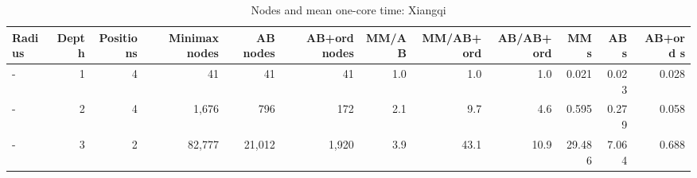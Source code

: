 \begin{table}[!t]
\centering
\caption{Nodes and mean one-core time: Xiangqi}
\label{tab:nodes_xiangqi}
\small
\begin{tabular}{lrrrrrrrrrrr}
\toprule
Radius & Depth & Positions & Minimax nodes & AB nodes & AB+ord nodes & MM/AB & MM/AB+ord & AB/AB+ord & MM s & AB s & AB+ord s \\
\midrule
- & 1 & 4 & 41 & 41 & 41 & 1.0 & 1.0 & 1.0 & 0.021 & 0.023 & 0.028 \\
- & 2 & 4 & 1,676 & 796 & 172 & 2.1 & 9.7 & 4.6 & 0.595 & 0.279 & 0.058 \\
- & 3 & 2 & 82,777 & 21,012 & 1,920 & 3.9 & 43.1 & 10.9 & 29.486 & 7.064 & 0.688 \\
\bottomrule
\end{tabular}
\end{table}
